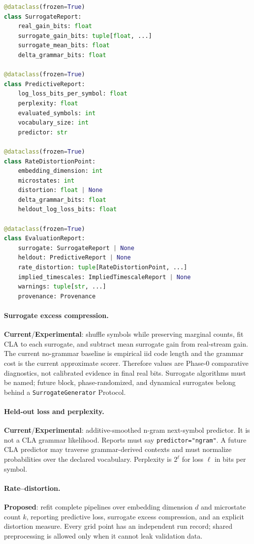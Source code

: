 \documentclass[11pt]{article}
\newcommand{\Current}{\textbf{Current}}
\newcommand{\Proposed}{\textbf{Proposed}}
\newcommand{\Experimental}{\textbf{Experimental}}
\begin{document}
\begin{lstlisting}[language=Python]
@dataclass(frozen=True)
class SurrogateReport:
    real_gain_bits: float
    surrogate_gain_bits: tuple[float, ...]
    surrogate_mean_bits: float
    delta_grammar_bits: float

@dataclass(frozen=True)
class PredictiveReport:
    log_loss_bits_per_symbol: float
    perplexity: float
    evaluated_symbols: int
    vocabulary_size: int
    predictor: str

@dataclass(frozen=True)
class RateDistortionPoint:
    embedding_dimension: int
    microstates: int
    distortion: float | None
    delta_grammar_bits: float
    heldout_log_loss_bits: float

@dataclass(frozen=True)
class EvaluationReport:
    surrogate: SurrogateReport | None
    heldout: PredictiveReport | None
    rate_distortion: tuple[RateDistortionPoint, ...]
    implied_timescales: ImpliedTimescaleReport | None
    warnings: tuple[str, ...]
    provenance: Provenance
\end{lstlisting}

\paragraph{Surrogate excess compression.}
\Current/\Experimental: shuffle symbols while preserving marginal counts, fit
CLA to each surrogate, and subtract mean surrogate gain from real-stream gain.
The current no-grammar baseline is empirical iid code length and the grammar
cost is the current approximate scorer. Therefore values are Phase-0 comparative
diagnostics, not calibrated evidence in final real bits. Surrogate algorithms
must be named; future block, phase-randomized, and dynamical surrogates belong
behind a \texttt{SurrogateGenerator} Protocol.

\paragraph{Held-out loss and perplexity.}
\Current/\Experimental: additive-smoothed n-gram next-symbol predictor. It is
not a CLA grammar likelihood. Reports must say \texttt{predictor="ngram"}. A
future CLA predictor may traverse grammar-derived contexts and must normalize
probabilities over the declared vocabulary. Perplexity is $2^{\ell}$ for loss
$\ell$ in bits per symbol.

\paragraph{Rate--distortion.}
\Proposed: refit complete pipelines over embedding dimension $d$ and microstate
count $k$, reporting predictive loss, surrogate excess compression, and an
explicit distortion measure. Every grid point has an independent run record;
shared preprocessing is allowed only when it cannot leak validation data.
\end{document}
